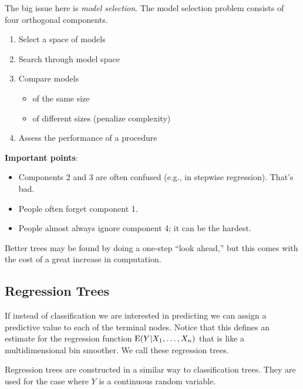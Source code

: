 The big issue here is \emph{model selection}.  The model
selection problem consists of four orthogonal components.

\begin{enumerate}

\item Select a space of models

\item Search through model space

\item Compare models
  \begin{itemize}
    \item of the same size
    \item of different sizes (penalize complexity)
  \end{itemize}

\item Assess the performance of a procedure

\end{enumerate}


\textbf{Important points}:
\begin{itemize}
\item Components 2 and 3 are often confused (e.g., in
  stepwise regression).  That's bad.  

\item People often forget component 1.
  
\item People almost always ignore component 4; it can be the hardest.

\end{itemize} 


Better trees may be found by doing a one-step ``look ahead,'' but this
comes with the cost of a great increase in computation.


\subsection{Regression Trees}
If instead of classification we are interested in predicting we can
assign a predictive value to each of the terminal nodes. Notice that
this defines an estimate for the regression function
$\mbox{E}(Y|X_1,\dots,X_n)$ that is like a multidimensional bin smoother.
We call these regression trees.

Regression trees are constructed in a similar way to classification
trees. They are used for the case where $Y$ is a
continuous random variable. 



